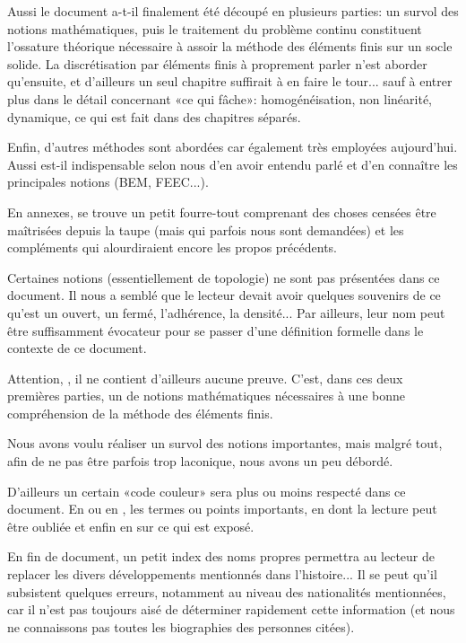 \documentclass[11pt,pdflatex]{book}
\begin{document}
Aussi le document a-t-il finalement été découpé en plusieurs parties: 
un survol des notions mathématiques, puis le traitement du problème continu constituent l'ossature théorique nécessaire à assoir la méthode des éléments finis sur un socle solide. La discrétisation par éléments finis à proprement parler n'est aborder qu'ensuite, et d'ailleurs un seul chapitre suffirait à en faire le tour... sauf à entrer plus dans le détail concernant «ce qui fâche»: homogénéisation, non linéarité, dynamique, ce qui est fait dans des chapitres séparés.

\medskip
Enfin, d'autres méthodes sont abordées car également très employées aujourd'hui. Aussi est-il indispensable selon nous d'en avoir entendu parlé et d'en connaître les principales notions (BEM, FEEC...).

\medskip
En annexes, se trouve un petit fourre-tout comprenant des choses censées être maîtrisées depuis la taupe (mais qui parfois nous sont demandées) et les compléments qui alourdiraient encore les propos précédents.

\medskip
Certaines notions (essentiellement de topologie) ne sont pas présentées dans ce document.
Il nous a semblé que le lecteur devait avoir quelques souvenirs de ce qu'est un ouvert, un fermé, l'adhérence, la densité...
Par ailleurs, leur nom peut être suffisamment évocateur pour se passer d'une définition formelle dans le contexte de ce document.

\bigskip
Attention, , il ne contient d'ailleurs aucune preuve.
C'est, dans ces deux premières parties, un  de notions mathématiques nécessaires à une bonne compréhension de la méthode des éléments finis.

Nous avons voulu réaliser un survol des notions importantes, mais malgré tout, afin de ne pas être parfois trop laconique, nous avons un peu débordé. \ifVersionDuDocEstVincent{}\fi

\medskip
\ifVersionDuDocEstVincent
D'ailleurs un certain «code couleur» sera plus ou moins respecté dans ce document. En  ou en , les termes ou points importants, en  dont la lecture peut être oubliée et enfin en  sur ce qui est exposé.
\fi

\medskip
En fin de document, un petit index des noms propres permettra au lecteur de replacer les divers développements mentionnés dans l'histoire...
Il se peut qu'il subsistent quelques erreurs, notamment au niveau des nationalités mentionnées, car il n'est pas toujours aisé de déterminer rapidement cette information (et nous ne connaissons pas toutes les biographies des personnes citées).
\end{document}
